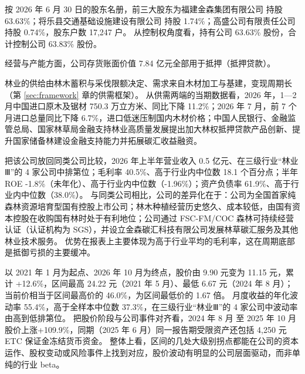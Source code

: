  按 2026 年 6 月 30 日的股东名册，前三大股东为福建金森集团有限公司 持股 63.63\%；将乐县交通基础设施建设有限公司 持股 1.74\%；高盛公司有限责任公司 持股 0.74\%，股东户数 17,247 户。 从控制权角度看，持有公司 63.63\% 股份，合计控制公司 63.83\% 股份。

 经营与产能方面，公司存货账面价值 7.84 亿元全部用于抵押（抵押贷款）。

 林业的供给由林木蓄积与采伐限额决定、需求来自木材加工与基建，变现周期长（第 \ref{sec:framework} 章的供需框架）。 从供需两端的当期数据看，2026 年，1—2 月中国进口原木及锯材 750.3 万立方米、同比下降 11.2\%；2026 年 7 月，前 7 个月进口总量同比下降 6.7\%，进口低迷压制国内木材价格；中国人民银行、金融监管总局、国家林草局金融支持林业高质量发展提出加大林权抵押贷款产品创新、提升国家储备林建设金融支持能力并拓展碳汇收益融资。

 把该公司放回同类公司比较，2026 年上半年营业收入 0.5 亿元、在三级行业“林业Ⅲ”的 4 家公司中排第位；毛利率 40.5\%、高于行业内中位数 18.1 个百分点；半年 ROE -1.8\%（未年化）、高于行业内中位数（-1.96\%）；资产负债率 61.9\%、高于行业内中位数（38.0\%）。 与同类公司相比，公司的差异化在于：公司为全国首家纯森林资源培育型国有控股上市公司；林木种植经营历史悠久、成本较低，由国有资本控股在收购国有林时处于有利地位；公司通过 FSC-FM/COC 森林可持续经营认证（认证机构为 SGS），并设立金森碳汇科技有限公司发展林草碳汇服务及其他林业技术服务。 优势在报表上主要体现为高于行业平均的毛利率，这在周期底部是抵御亏损的主要缓冲。

 以 2021 年 1 月为起点、2026 年 10 月为终点，股价由 9.90 元变为 11.15 元，累计 +12.6\%，区间最高 24.22 元（2021 年 5 月）、最低 6.67 元（2024 年 8 月）；当前价相当于区间最高价的 46.0\%，为区间最低价的 1.67 倍。 月度收益的年化波动率 55.4\%，高于全样本中位数 37.3\%，在三级行业“林业Ⅲ”的 4 家公司中波动率由高到低排第位。 把股价阶段与公司事件对齐看，2024 年 8 月 至 2025 年 10 月股价上涨+109.9\%，同期（2025 年 6 月）同一报告期受限资产还包括 4,250 元 ETC 保证金冻结货币资金。 整体上看，区间的几处大级别拐点都能在公司的资本运作、股权变动或风险事件上找到对应，股价波动有明显的公司层面驱动，而非单纯的行业 beta。

